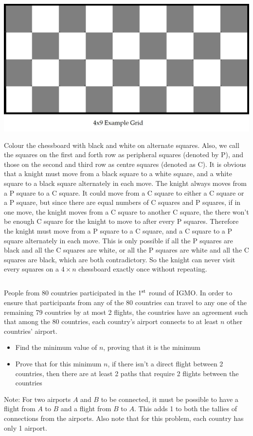 \documentclass[12pt]{article}
\begin{document}
 \begin{center}
     \includegraphics[width = 14cm]{Figure2.2.png}
 \end{center}
Colour the chessboard with black and white on alternate squares. Also, we call the squares on the first and forth row as peripheral squares (denoted by P), and those on the second and third row as centre squares (denoted as C). It is obvious that a knight must move from a black square to a white square, and a white square to a black square alternately  in each move. The knight always moves from a P square to a C square. It could move from a C square to either a C square or a P square, but since there are equal numbers of C squares and P squares,  if in one move, the knight moves from a C square to another C square, the there won't be enough C square for the knight to move to after every P squares. Therefore the knight must move from a P square to a C square, and a C square to a P square alternately  in each move. This is only possible if all the P squares are black and all the C squares are white, or all the P squares are white and all the C squares are black, which are both contradictory. So the knight can never visit every squares on a $4 \times n$ chessboard exactly once without repeating.


\subsection*{}
People from 80 countries participated in the $1^{\textmd{st}}$ round of IGMO. In order to ensure that participants from any of the 80 countries can travel to any one of the remaining 79 countries by at most 2 flights, the countries have an agreement such that among the 80 countries, each country's airport connects to at least $n$ other countries' airport. 
\begin{itemize}
    \item Find the minimum value of $n$, proving that it is the minimum
    \item Prove that for this minimum $n$, if there isn't a direct flight between 2 countries, then there are at least 2 paths that require 2 flights between the countries
\end{itemize}
Note: For two airports $A$ and $B$ to be connected, it must be possible to have a flight from $A$ to $B$ and a flight from $B$ to $A$. This adds 1 to both the tallies of connections from the airports. Also note that for this problem, each country has only 1 airport.
\end{document}
